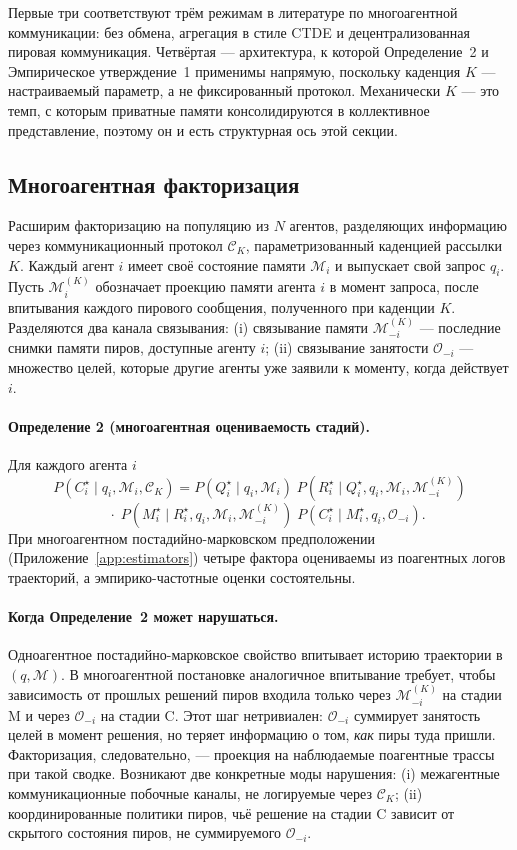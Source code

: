 \documentclass{article}
\begin{document}
Первые три соответствуют трём режимам в литературе по многоагентной
коммуникации: без обмена, агрегация в стиле CTDE и
децентрализованная пировая коммуникация. Четвёртая --- архитектура, к
которой Определение~2 и Эмпирическое утверждение~1 применимы
напрямую, поскольку каденция $K$ --- настраиваемый параметр, а не
фиксированный протокол. Механически $K$ --- это темп, с которым приватные
памяти консолидируются в коллективное представление, поэтому он и есть
структурная ось этой секции.

\subsection{Многоагентная факторизация}
\label{sec:multi-theory}

Расширим факторизацию на популяцию из $N$ агентов, разделяющих
информацию через коммуникационный протокол $\mathcal{C}_K$,
параметризованный каденцией рассылки $K$. Каждый агент $i$ имеет своё
состояние памяти $\mathcal{M}_i$ и выпускает свой запрос $q_i$. Пусть
$\mathcal{M}_i^{(K)}$ обозначает проекцию памяти агента $i$ в
момент запроса, после впитывания каждого пирового сообщения, полученного
при каденции $K$. Разделяются два канала связывания: (i) связывание
памяти $\mathcal{M}_{-i}^{(K)}$ --- последние снимки памяти пиров,
доступные агенту $i$; (ii) связывание занятости $\mathcal{O}_{-i}$ ---
множество целей, которые другие агенты уже заявили к моменту,
когда действует $i$.

\paragraph{Определение 2 (многоагентная оцениваемость стадий).}
Для каждого агента $i$
\[
P(C^\star_i \mid q_i, \mathcal{M}_i, \mathcal{C}_K)
=
P(Q^\star_i \mid q_i, \mathcal{M}_i)\;
P(R^\star_i \mid Q^\star_i, q_i, \mathcal{M}_i, \mathcal{M}_{-i}^{(K)})
\]
\[
\quad \cdot\;
P(M^\star_i \mid R^\star_i, q_i, \mathcal{M}_i, \mathcal{M}_{-i}^{(K)})\;
P(C^\star_i \mid M^\star_i, q_i, \mathcal{O}_{-i}).
\]
При многоагентном постадийно-марковском предположении
(Приложение~\ref{app:estimators}) четыре фактора оцениваемы из
поагентных логов траекторий, а эмпирико-частотные оценки
состоятельны.

\paragraph{Когда Определение~2 может нарушаться.}
Одноагентное постадийно-марковское свойство впитывает историю траектории в
$(q, \mathcal{M})$. В многоагентной постановке аналогичное
впитывание требует, чтобы зависимость от прошлых решений пиров входила только
через $\mathcal{M}_{-i}^{(K)}$ на стадии M и через
$\mathcal{O}_{-i}$ на стадии C. Этот шаг нетривиален:
$\mathcal{O}_{-i}$ суммирует занятость целей в момент решения, но
теряет информацию о том, \emph{как} пиры туда пришли.
Факторизация, следовательно, --- проекция на наблюдаемые поагентные
трассы при такой сводке. Возникают две конкретные моды нарушения: (i)
межагентные коммуникационные побочные каналы, не логируемые через
$\mathcal{C}_K$; (ii) координированные политики пиров, чьё решение на
стадии C зависит от скрытого состояния пиров, не суммируемого
$\mathcal{O}_{-i}$.
\end{document}
